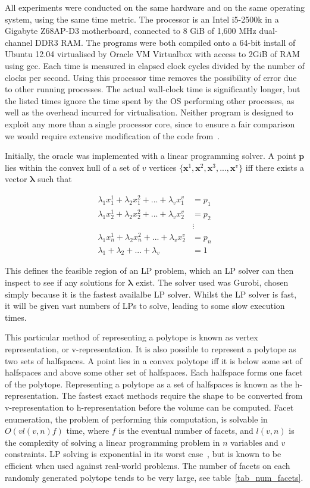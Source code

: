 All experiments were conducted on the same hardware and on the same operating system, using the same time metric. The processor is an Intel i5-2500k in a Gigabyte Z68AP-D3 motherboard, connected to 8 GiB of 1,600 MHz dual-channel DDR3 RAM. The programs were both compiled onto a 64-bit install of Ubuntu 12.04 virtualised by Oracle VM Virtualbox with access to 2GiB of RAM using gcc. Each time is measured in elapsed clock cycles divided by the number of clocks per second. Using this processor time removes the possibility of error due to other running processes. The actual wall-clock time is significantly longer, but the listed times ignore the time spent by the OS performing other processes, as well as the overhead incurred for virtualisation. Neither program is designed to exploit any more than a single processor core, since to ensure a fair comparison we would require extensive modification of the code from~\cite{Bueler98}.

Initially, the oracle was implemented with a linear programming solver. A point ${\bm p}$ lies within the convex hull of a set of $v$ vertices $\{{\bm x}^1, {\bm x}^2, {\bm x}^3, ..., {\bm x}^v\}$ iff there exists a vector ${\bm \lambda}$ such that

\begin{align*}
\lambda_1 x^1_1 + \lambda_2 x^2_1 + ... + \lambda_v x^v_1 &= p_1 \\
\lambda_1 x^1_2 + \lambda_2 x^2_2 + ... + \lambda_v x^v_2 &= p_2 \\
&\vdots \\
\lambda_1 x^1_n + \lambda_2 x^2_n + ... + \lambda_v x^v_2 &= p_n \\
\lambda_1 + \lambda_2 + ... + \lambda_v &= 1
\end{align*}

This defines the feasible region of an LP problem, which an LP solver can then inspect to see if any solutions for ${\bm \lambda}$ exist. The solver used was Gurobi, chosen simply because it is the fastest availalbe LP solver. Whilst the LP solver is fast, it will be given vast numbers of LPs to solve, leading to some slow execution times.

This particular method of representing a polytope is known as vertex representation, or v-representation. It is also possible to represent a polytope as two sets of halfspaces. A point lies in a convex polytope iff it is below some set of halfspaces and above some other set of halfspaces. Each halfspace forms one facet of the polytope. Representing a polytope as a set of halfspaces is known as the h-representation. The fastest exact methods require the shape to be converted from v-representation to h-representation before the volume can be computed. Facet enumeration, the problem of performing this computation, is solvable in $O(vl(v,n)f)$ time\cite{Fukuda97}, where $f$ is the eventual number of facets, and $l(v,n)$ is the complexity of solving a linear programming problem in $n$ variables and $v$ constraints. LP solving is exponential in its worst case~\cite{Klee72}, but is known to be efficient when used against real-world problems. The number of facets on each randomly generated polytope tends to be very large, see table~\ref{tab_num_facets}.

